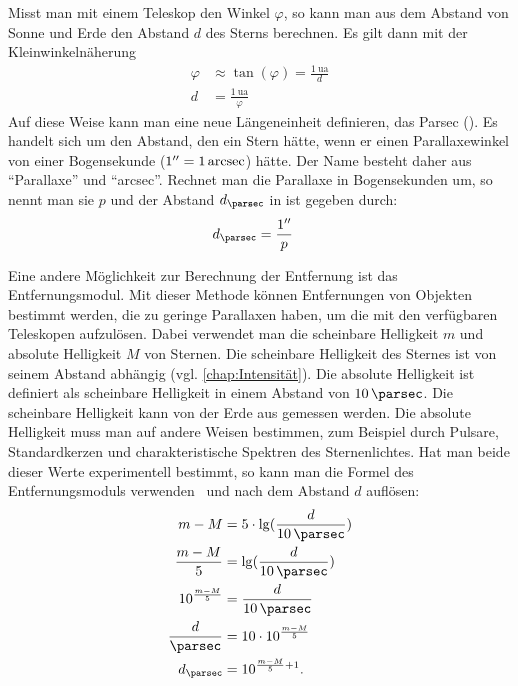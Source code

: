 Misst man mit einem Teleskop den Winkel $\varphi$, so kann man aus dem Abstand von Sonne und Erde den Abstand $d$ des Sterns berechnen. Es gilt dann mit der Kleinwinkelnäherung
\begin{align*}
	\varphi&\approx \tan(\varphi)=\frac{\SI{1}{\astronomicalunit}}{d}\\
	d&= \frac{\SI{1}{\astronomicalunit}}{\varphi}
\end{align*}
Auf diese Weise kann man eine neue Längeneinheit definieren, das Parsec (\unit{\parsec}). Es handelt sich um den Abstand, den ein Stern hätte, wenn er einen Parallaxewinkel von einer Bogensekunde ($\SI{1}{\arcsecond}=\SI{1}{\arcsec}$) hätte. Der Name besteht daher aus \enquote{Parallaxe} und \enquote{arcsec}. Rechnet man die Parallaxe in Bogensekunden um, so nennt man sie $p$ und der Abstand $d_{\text{\unit{\parsec}}}$ in \unit{\parsec} ist gegeben durch:
\begin{align*}
	d_{\text{\unit{\parsec}}}&=\frac{\SI{1}{\arcsecond}}{p}
\end{align*}

Eine andere Möglichkeit zur Berechnung der Entfernung ist das Entfernungsmodul. Mit dieser Methode können Entfernungen von Objekten bestimmt werden, die zu geringe Parallaxen haben, um die mit den verfügbaren Teleskopen aufzulösen. Dabei verwendet man die scheinbare Helligkeit $m$ und absolute Helligkeit $M$ von Sternen. Die scheinbare Helligkeit des Sternes ist von seinem Abstand abhängig (vgl. \cref{chap:Intensität}). Die absolute Helligkeit ist definiert als scheinbare Helligkeit in einem Abstand von $\SI{10}{\parsec}$. Die scheinbare Helligkeit kann von der Erde aus gemessen werden. Die absolute Helligkeit muss man auf andere Weisen bestimmen, zum Beispiel durch Pulsare, Standardkerzen und charakteristische Spektren des Sternenlichtes. Hat man beide dieser Werte experimentell bestimmt, so kann man die Formel des Entfernungsmoduls verwenden~\cite[S.17]{Cornelsen2013} und nach dem Abstand $d$ auflösen:
\begin{align*}
	m-M&=5\cdot \lg(\frac{d}{\SI{10}{\parsec}})\\
	\frac{m-M}{5}&=\lg(\frac{d}{\SI{10}{\parsec}})\\
	10^{\frac{m-M}{5}}&=\frac{d}{\SI{10}{\parsec}}\\
	\frac{d}{\unit{\parsec}}&=10\cdot10^{\frac{m-M}{5}}\\
	d_{\text{\unit{\parsec}}}&=10^{\frac{m-M}{5}+1}.
\end{align*}

